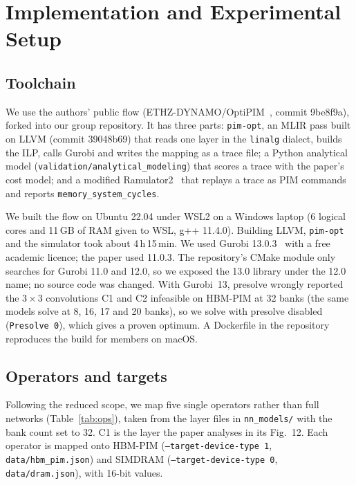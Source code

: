 \documentclass[conference]{IEEEtran}
\begin{document}
\section{Implementation and Experimental Setup}
\label{sec:setup}

\subsection{Toolchain}
We use the authors' public flow (ETHZ-DYNAMO/OptiPIM~\cite{optipimrepo},
commit 9be8f9a), forked into our group repository. It has three parts:
\texttt{pim-opt}, an MLIR pass built on LLVM (commit 39048b69) that reads one
layer in the \texttt{linalg} dialect, builds the ILP, calls Gurobi and writes
the mapping as a trace file; a Python analytical model
(\texttt{validation/analytical\_modeling}) that scores a trace with the
paper's cost model; and a modified Ramulator2~\cite{ramulator2} that replays a
trace as PIM commands and reports \texttt{memory\_system\_cycles}.

We built the flow on Ubuntu 22.04 under WSL2 on a Windows laptop (6 logical
cores and 11\,GB of RAM given to WSL, g++ 11.4.0). Building LLVM,
\texttt{pim-opt} and the simulator took about 4\,h\,15\,min. We used Gurobi
13.0.3~\cite{gurobi} with a free academic licence; the paper used 11.0.3. The repository's
CMake module only searches for Gurobi 11.0 and 12.0, so we exposed the 13.0
library under the 12.0 name; no source code was changed. With Gurobi~13,
presolve wrongly reported the $3{\times}3$ convolutions C1 and C2 infeasible on
HBM-PIM at 32 banks (the same models solve at 8, 16, 17 and 20 banks), so we
solve with presolve disabled (\texttt{Presolve 0}), which gives a proven
optimum. A Dockerfile in the repository reproduces the build for members on
macOS.

\subsection{Operators and targets}
Following the reduced scope, we map five single operators rather than full
networks (Table~\ref{tab:ops}), taken from the layer files in
\texttt{nn\_models/} with the bank count set to 32. C1 is the layer the paper
analyses in its Fig.~12. Each operator is mapped onto HBM-PIM
(\texttt{--target-device-type 1}, \texttt{data/hbm\_pim.json}) and SIMDRAM
(\texttt{--target-device-type 0}, \texttt{data/dram.json}), with 16-bit values.
\end{document}
